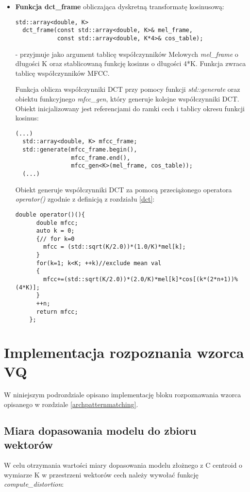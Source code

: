 \begin{itemize}
\item{\textbf{Funkcja dct\_frame} obliczająca dyskretną transformatę kosinusową:
 \begin{lstlisting}[style=lst:cpp]
  std::array<double, K>
  dct_frame(const std::array<double, K>& mel_frame,
            const std::array<double, K*4>& cos_table);
\end{lstlisting}
}
- przyjmuje jako argument tablicę współczynników Melowych \textit{mel\_frame} o długości K oraz stablicowaną funkcję kosinus o długości 4*K. Funkcja zwraca tablicę współczynników MFCC.

  Funkcja oblicza współczynniki DCT przy pomocy funkcji \textit{std::generate} oraz obiektu funkcyjnego \textit{mfcc\_gen}, który generuje kolejne współczynniki DCT. Obiekt inicjalizowany jest referencjami do ramki cech i tablicy okresu funkcji kosinus:
 \begin{lstlisting}[style=lst:cpp]
 (...)
  std::array<double, K> mfcc_frame;
  std::generate(mfcc_frame.begin(),
                mfcc_frame.end(),
                mfcc_gen<K>(mel_frame, cos_table));
  (...)
\end{lstlisting}

Obiekt generuje współczynniki DCT za pomocą przeciążonego operatora \textit{operator()} zgodnie z definicją z rozdziału {\ref{dct}}:
 \begin{lstlisting}[style=lst:cpp]
    double operator()(){
      double mfcc;
      auto k = 0;
      {// for k=0
        mfcc = (std::sqrt(K/2.0))*(1.0/K)*mel[k];
      }
      for(k=1; k<K; ++k)//exclude mean val
      {
        mfcc+=(std::sqrt(K/2.0))*(2.0/K)*mel[k]*cos[(k*(2*n+1))%(4*K)]; 
      }
      ++n;
      return mfcc; 
    };
 \end{lstlisting}
\end{itemize}

\section{Implementacja rozpoznania wzorca VQ}

W niniejszym podrozdziale opisano implementację bloku rozpoznawania wzorca opisanego w rozdziale \ref{archpatternmatching}.

\subsection{Miara dopasowania modelu do zbioru wektorów}

W celu otrzymania wartości miary dopasowania modelu złożnego z C centroid o wymiarze K w przestrzeni wektorów cech należy wywołać funkcję \textit{compute\_distortion}:

